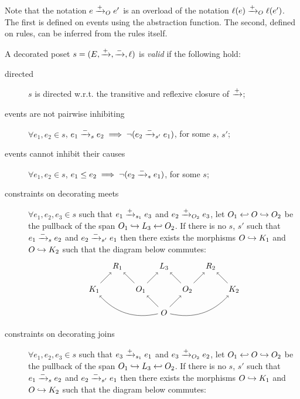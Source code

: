 Note that the notation $e\mathrel{\xrightarrow{+}}_O e'$ is an overload of the notation $\ell(e)\mathrel{\xrightarrow{+}}_O \ell(e')$. The first is defined on events using the abstraction function. The second, defined on rules, can be inferred from the rules itself.

\begin{definition}
  \label{def:constraints_poset}
  A decorated poset $s = (E,\mathrel{\xrightarrow{+}},\mathrel{\xrightarrow{-}},\ell)$ is \emph{valid} if the following hold:
  \begin{description}
  \item[directed]
    $s$ is directed w.r.t. the transitive and reflexive closure of $\mathrel{\xrightarrow{+}}$;
  \item[events are not pairwise inhibiting]
    $\forall e_1,e_2\in s$, $e_1\mathrel{\xrightarrow{-}}_s e_2\implies \neg(e_2 \mathrel{\xrightarrow{-}}_{s'} e_1)$, for some $s$, $s'$;
  \item[events cannot inhibit their causes]
    $\forall e_1,e_2\in s$, $e_1\leq e_2\implies \neg(e_2 \mathrel{\xrightarrow{-}}_{s} e_1)$, for some $s$;
  \item[constraints on decorating meets]
    $\forall e_1,e_2,e_3\in s$ such that $e_1\mathrel{\xrightarrow{+}}_{s_1} e_3$ and $e_2\mathrel{\xrightarrow{+}}_{O_2} e_3$, let $O_1\hookleftarrow O\hookrightarrow O_2$ be the pullback of the span $O_1\hookrightarrow L_3 \hookleftarrow O_2$.
If there is no $s$, $s'$ such that $e_1\mathrel{\xrightarrow{-}}_s e_2$ and $e_2\mathrel{\xrightarrow{-}}_{s'} e_1$ then there exists the morphisms $O\hookrightarrow K_1$ and $O\hookrightarrow K_2$ such that the diagram below commutes:
    \[
    \begin{tikzpicture} %
      \node (o) at (0,-1) {\(O\)};
      \node (r3) at (0,1) {\(L_3\)};
      \node (o1) at (-1,0) {\(O_1\)};
      \node (o2) at (1,0) {\(O_2\)};
      \node (r1) at (-2,1) {\(R_1\)};
      \node (r2) at (2,1) {\(R_2\)};
      \node (k1) at (-3,0) {\(K_1\)};
      \node (k2) at (3,0) {\(K_2\)};
      \draw [->] (o) -- (o1);
      \draw [->] (o) -- (o2);
      \draw [->] (o1) -- (r3);
      \draw [->] (o2) -- (r3);
      \draw [->] (o1) -- (r1);
      \draw [->] (o2) -- (r2);
      \draw [->] (k1) -- (r1);
      \draw [->] (k2) -- (r2);
      \draw [->] (o) to [bend left] (k1);
      \draw [->] (o) to [bend right] (k2);
    \end{tikzpicture}
    \]
  \item[constraints on decorating joins]
    $\forall e_1,e_2,e_3\in s$ such that $e_3\mathrel{\xrightarrow{+}}_{s_1} e_1$ and $e_3\mathrel{\xrightarrow{+}}_{O_2} e_2$, let $O_1\hookleftarrow O\hookrightarrow O_2$ be the pullback of the span $O_1\hookrightarrow L_3 \hookleftarrow O_2$.
    If there is no $s$, $s'$ such that $e_1\mathrel{\xrightarrow{-}}_s e_2$ and $e_2\mathrel{\xrightarrow{-}}_{s'} e_1$ then there exists the morphisms $O\hookrightarrow K_1$ and $O\hookrightarrow K_2$ such that the diagram below commutes:

\end{description}
\end{definition}
